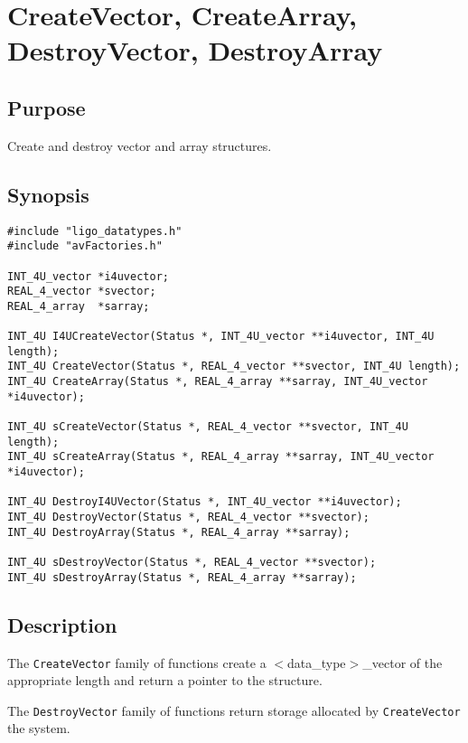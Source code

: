 \documentclass{article}
\begin{document}
\section{CreateVector, CreateArray, DestroyVector, DestroyArray}

\subsection{Purpose}

Create and destroy vector and array structures. 

\subsection{Synopsis}


\begin{verbatim}
#include "ligo_datatypes.h"
#include "avFactories.h"

INT_4U_vector *i4uvector;
REAL_4_vector *svector;
REAL_4_array  *sarray;

INT_4U I4UCreateVector(Status *, INT_4U_vector **i4uvector, INT_4U length);
INT_4U CreateVector(Status *, REAL_4_vector **svector, INT_4U length);
INT_4U CreateArray(Status *, REAL_4_array **sarray, INT_4U_vector *i4uvector);

INT_4U sCreateVector(Status *, REAL_4_vector **svector, INT_4U length);
INT_4U sCreateArray(Status *, REAL_4_array **sarray, INT_4U_vector *i4uvector);

INT_4U DestroyI4UVector(Status *, INT_4U_vector **i4uvector);
INT_4U DestroyVector(Status *, REAL_4_vector **svector);
INT_4U DestroyArray(Status *, REAL_4_array **sarray);

INT_4U sDestroyVector(Status *, REAL_4_vector **svector);
INT_4U sDestroyArray(Status *, REAL_4_array **sarray);

\end{verbatim}

\subsection{Description}

The {\tt CreateVector\/} family of functions create a
$<$data\_type$>$\_vector of the appropriate length and return a pointer
to the structure. 

The {\tt DestroyVector\/} family of functions return storage allocated
by {\tt CreateVector\/} the system. 
\end{document}
